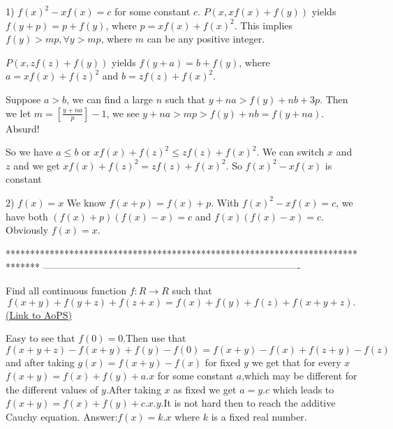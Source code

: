 \begin{solution}
	1) $f(x)^2-xf(x)=c$ for some constant $c$.
$P(x,xf(x)+f(y))$ yields $f(y+p)=p+f(y)$, where $p=xf(x)+f(x)^2$. This implies $f(y)>mp,\forall y>mp$, where $m$ can be any positive integer.

$P(x,zf(z)+f(y))$ yields $f(y+a)=b+f(y)$, where $a=xf(x)+f(z)^2$ and $b=zf(z)+f(x)^2$.

Suppose $a>b$, we can find a large $n$ such that $y+na>f(y)+nb+3p$. Then we let $m=[\frac{y+na}p]-1$, we see 
$y+na>mp>f(y)+nb=f(y+na)$. Absurd!

So we have $a\leq b$ or  $xf(x)+f(z)^2\leq zf(z)+f(x)^2$. We can switch $x$ and $z$ and we get 
$xf(x)+f(z)^2= zf(z)+f(x)^2$. So $f(x)^2-xf(x)$ is constant

2) $f(x)=x$
We know $f(x+p)=f(x)+p$. With $f(x)^2-xf(x)=c$, we have
both $(f(x)+p)(f(x)-x)=c$ and $f(x)(f(x)-x)=c$. Obviously $f(x)=x$.
\end{solution}
*******************************************************************************
-------------------------------------------------------------------------------

\begin{problem}
	Find all continuous function $f:R\rightarrow R$  such that   \[ f(x+y)+f(y+z)+f(z+x)=f(x)+f(y)+f(z)+f(x+y+z) .\]
	\flushright \href{https://artofproblemsolving.com/community/c6h532771}{(Link to AoPS)}
\end{problem}



\begin{solution}
	Easy to see that $f(0)=0$.Then use that $f(x+y+z)-f(x+y)+f(y)-f(0)=f(x+y)-f(x)+f(z+y)-f(z)$ and after taking $g(x)=f(x+y)-f(x) $ for fixed $y$ we get that for every $x$ $f(x+y)=f(x)+f(y)+a.x$ for some constant $a$,which may be different for the different values of $y$.After taking $x$ as fixed we get $a=y.c$ which leads to $f(x+y)=f(x)+f(y)+c.x.y$.It is not hard then to reach the additive Cauchy equation.
Answer:$f(x)=k.x$ where $k$ is a fixed real number.
\end{solution}



